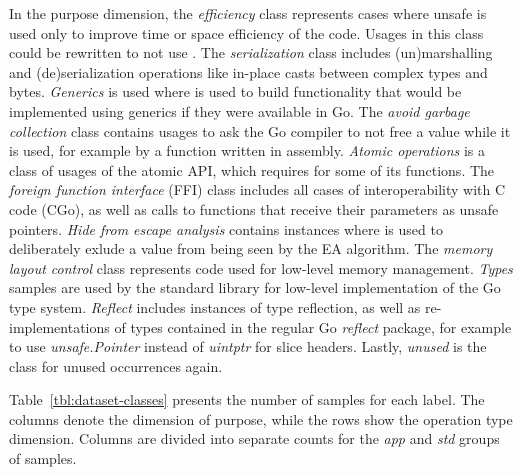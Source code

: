 In the purpose dimension, the \textit{efficiency} class represents cases where unsafe is used only to improve time or
space efficiency of the code.
Usages in this class could be rewritten to not use \unsafe{}.
The \textit{serialization} class includes (un)marshalling and (de)serialization operations like in-place casts between
complex types and bytes.
\textit{Generics} is used where \unsafe{} is used to build functionality that would be implemented using generics if
they were available in Go.
The \textit{avoid garbage collection} class contains usages to ask the Go compiler to not free a value while it is used,
for example by a function written in assembly.
\textit{Atomic operations} is a class of usages of the atomic \acrshort{API}, which requires \unsafe{} for some of its
functions.
The \textit{foreign function interface} (\acrshort{FFI}) class includes all cases of interoperability with C code (CGo),
as well as calls to functions that receive their parameters as unsafe pointers.
\textit{Hide from escape analysis} contains instances where \unsafe{} is used to deliberately exlude a value from being
seen by the \acrshort{EA} algorithm.
The \textit{memory layout control} class represents code used for low-level memory management.
\textit{Types} samples are used by the standard library for low-level implementation of the Go type system.
\textit{Reflect} includes instances of type reflection, as well as re-implementations of types contained in the regular
Go \textit{reflect} package, for example to use \textit{unsafe.Pointer} instead of \textit{uintptr} for slice headers.
Lastly, \textit{unused} is the class for unused occurrences again.

Table~\ref{tbl:dataset-classes} presents the number of samples for each label.
The columns denote the dimension of purpose, while the rows show the operation type dimension.
Columns are divided into separate counts for the \textit{app} and \textit{std} groups of samples.



